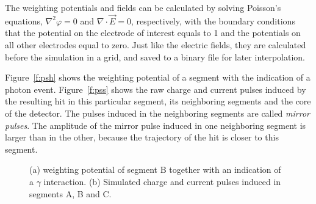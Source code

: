 \documentclass[epj]{svjour}
\begin{document}
The weighting potentials and fields can be calculated by solving
Poisson's equations, $\nabla^{2} \varphi = 0$ and $\nabla \cdot
\vec{E} = 0$, respectively, with the boundary conditions that the
potential on the electrode of interest equals to 1 and the potentials
on all other electrodes equal to zero. Just like the electric fields,
they are calculated before the simulation in a grid, and saved to a
binary file for later interpolation.

Figure~\ref{f:psh} shows the weighting potential of a segment with the
indication of a photon event. Figure~\ref{f:pss} shows the raw charge
and current pulses induced by the resulting hit in this particular
segment, its neighboring segments and the core of the detector. The
pulses induced in the neighboring segments are called \emph{mirror
pulses}. The amplitude of the mirror pulse induced in one neighboring
segment is larger than in the other, because the trajectory of the hit
is closer to this segment.
\begin{figure}[tb] 
\centering 
{}%
% 
\caption{(a) weighting potential of segment B together with an
indication of a $\gamma$ interaction. (b) Simulated charge and current
pulses induced in segments A, B and C.}
\label{f:ps} 
\end{figure} 
\end{document}
